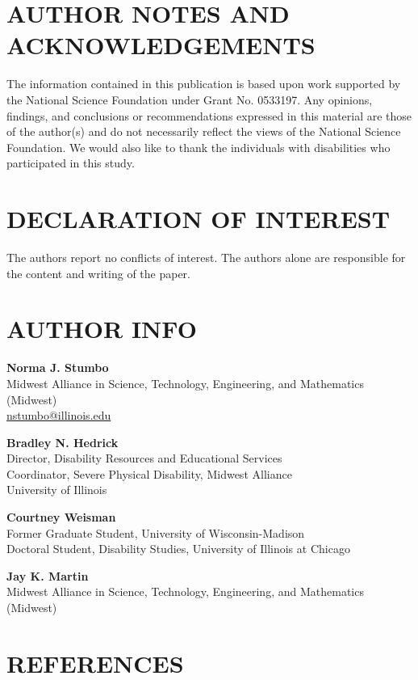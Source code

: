 \documentclass[11.5pt]{sig-alternate} %
\begin{document}
\begin{large}
\section*{AUTHOR NOTES AND ACKNOWLEDGEMENTS}
The information contained in this publication is based upon work supported by the National Science Foundation under Grant No. 0533197. Any opinions, findings, and conclusions or recommendations expressed in this material are those of the author(s) and do not necessarily reflect the views of the National Science Foundation. We would also like to thank the individuals with disabilities who participated in this study.

\section*{DECLARATION OF INTEREST}
The authors report no conflicts of interest. The authors alone are responsible for the content and writing of the paper.

\section*{AUTHOR INFO}
\textbf{Norma J. Stumbo}\\
Midwest Alliance in Science, Technology, Engineering, and Mathematics (Midwest)\\
\href{mailto:nstumbo@illinois.edu}{nstumbo@illinois.edu}

\textbf{Bradley N. Hedrick}\\
Director, Disability Resources and Educational Services\\
Coordinator, Severe Physical Disability, Midwest Alliance\\
University of Illinois

\textbf{Courtney Weisman}\\
Former Graduate Student, University of Wisconsin-Madison\\
Doctoral Student, Disability Studies, University of Illinois at Chicago

\textbf{Jay K. Martin}\\
Midwest Alliance in Science, Technology, Engineering, and Mathematics (Midwest)

\end{large}
\clearpage
\section*{REFERENCES}\par 
\end{document}
